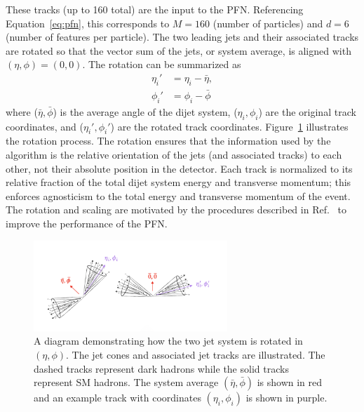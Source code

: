 These tracks (up to 160 total) are the input to the PFN. Referencing Equation~\ref{eq:pfn}, this corresponds to $M = 160$ (number of particles) and $d = 6$ (number of features per particle). The two leading jets and their associated tracks are rotated so that the vector sum of the jets, or system average, is aligned with $(\eta,\phi) = (0,0)$. The rotation can be summarized as 
\begin{subequations}
    \begin{align}
       \eta_{i}' &= \eta_i - \bar{\eta},  \\
        \phi_{i}' &= \phi_i - \bar{\phi}
    \end{align}
\end{subequations}
where ($\bar{\eta}, \bar{\phi}$) is the average angle of the dijet system,  ($\eta_{i}, \phi_{i}$) are the original track coordinates, and ($\eta_{i}', \phi_{i}'$) are the rotated track coordinates. Figure~\ref{fig:jet_rotate} illustrates the rotation process. The rotation ensures that the information used by the algorithm is the relative orientation of the jets (and associated tracks) to each other, not their absolute position in the detector. Each track is normalized to its relative fraction of the total dijet system energy and transverse momentum; this enforces agnosticism to the total energy and transverse momentum of the event. The rotation and scaling are motivated by the procedures described in Ref.~\cite{pfn} to improve the performance of the PFN. 

\begin{figure}[!htbp]
\centering
   \includegraphics[width=0.65\textwidth]{figures/ml/jet_rotate}
    \caption{A diagram demonstrating how the two jet system is rotated in $(\eta,\phi)$. The jet cones and associated jet tracks are illustrated. The dashed tracks represent dark hadrons while the solid tracks represent SM hadrons. The system average $(\bar{\eta},\bar{\phi})$ is shown in red and an example track with coordinates $(\eta_i,\phi_i)$ is shown in purple.
    \label{fig:jet_rotate}}
\end{figure}


